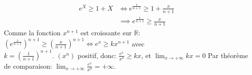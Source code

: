 \documentclass[9pt,twoside]{article}
\begin{document}
\begin{align*}
	e^X\geq 1 + X & \iff e^{\frac{x}{n+1}} \geq 1+\frac{x}{n+1} \\
	& \implies e^{\frac{x}{n+1}} \geq\frac{x}{n+1} 
\end{align*}
Comme la fonction $x^{n+1}$ est croissante sur $\mathbb{R}$: $(e^{\frac{x}{n+1}})^{n+1} \geq (\frac{x}{n+1})^{n+1} \iff e^x \geq kx^{n+1}$ avec\\ $k=(\frac{1}{n+1})^{n+1}$.
$(x^n)$ positif, donc: $\frac{e^x}{x^n}\geq kx$, et $\lim_{x\to+\infty}kx=0$
Par théorème de comparaison: $\lim_{x\to+\infty}\frac{e^x}{x^n}=+\infty$.
\end{document}
